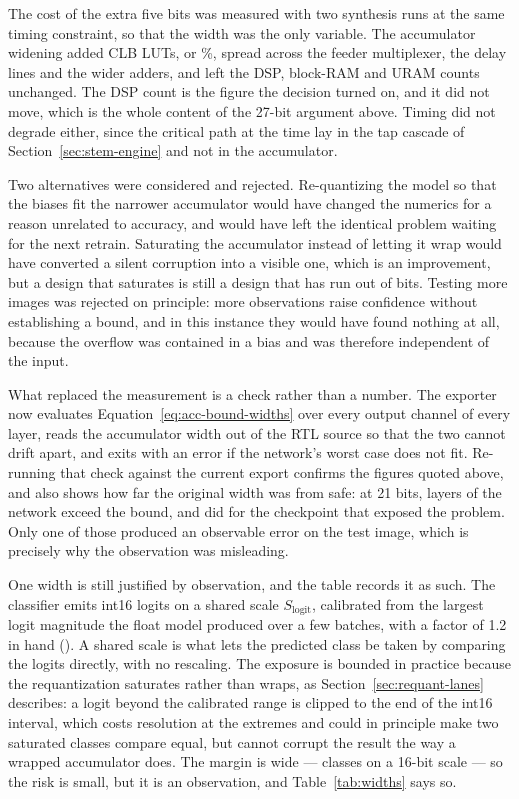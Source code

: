 The cost of the extra five bits was measured with two synthesis runs at the
same timing constraint, so that the width was the only variable. The
accumulator widening added \thAccLutDelta{} CLB LUTs, or \thAccLutPct\%, spread
across the feeder multiplexer, the delay lines and the wider adders, and left
the DSP, block-RAM and URAM counts unchanged. The DSP count is the figure the
decision turned on, and it did not move, which is the whole content of the
27-bit argument above. Timing did not degrade either, since the critical path
at the time lay in the tap cascade of Section~\ref{sec:stem-engine} and not in
the accumulator.

Two alternatives were considered and rejected. Re-quantizing the model so that
the biases fit the narrower accumulator would have changed the numerics for a
reason unrelated to accuracy, and would have left the identical problem waiting
for the next retrain. Saturating the accumulator instead of letting it wrap
would have converted a silent corruption into a visible one, which is an
improvement, but a design that saturates is still a design that has run out of
bits. Testing more images was rejected on principle: more observations raise
confidence without establishing a bound, and in this instance they would have
found nothing at all, because the overflow was contained in a bias and was
therefore independent of the input.

What replaced the measurement is a check rather than a number. The exporter
now evaluates Equation~\eqref{eq:acc-bound-widths} over every output channel of
every layer, reads the accumulator width out of the RTL source so that the two
cannot drift apart, and exits with an error if the network's worst case does
not fit. Re-running that check against the current export confirms the figures
quoted above, and also shows how far the original width was from safe:
at 21 bits, \thAccUnsafeLayers{} layers of the network exceed the bound, and
\thAccUnsafeLayersPrev{} did for the checkpoint that exposed the problem. Only
one of those produced an observable error on the test image, which is precisely
why the observation was misleading.

One width is still justified by observation, and the table records it as such.
The classifier emits int16 logits on a shared scale $S_{\mathrm{logit}}$,
calibrated from the largest logit magnitude the float model produced over a
few batches, with a factor of 1.2 in hand (). A shared scale is what
lets the predicted class be taken by comparing the \thClasses{} logits
directly, with no rescaling. The exposure is bounded in practice because the
requantization saturates rather than wraps, as Section~\ref{sec:requant-lanes}
describes: a logit beyond the calibrated range is clipped to the end of the
int16 interval, which costs resolution at the extremes and could in principle
make two saturated classes compare equal, but cannot corrupt the result the way
a wrapped accumulator does. The margin is wide --- \thClasses{} classes on a
16-bit scale --- so the risk is small, but it is an observation, and
Table~\ref{tab:widths} says so.

